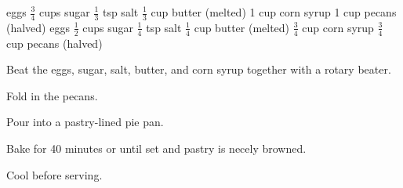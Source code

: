 \dishtype{\dessert}
\dishother{\vegetarian}
\begin{ingreds}
     eggs
        $\frac{3}{4}$ cups sugar
        $\frac{1}{3}$ tsp salt
        $\frac{1}{3}$ cup butter (melted)
        1 cup corn syrup
        1 cup pecans (halved)
     eggs
        $\frac{1}{2}$ cups sugar
        $\frac{1}{4}$ tsp salt
        $\frac{1}{4}$ cup butter (melted)
        $\frac{3}{4}$ cup corn syrup
        $\frac{3}{4}$ cup pecans (halved)
\end{ingreds}
\begin{method}
    Beat the eggs, sugar, salt, butter, and corn syrup together with a rotary beater.\par
    Fold in the pecans.\par
    Pour into a pastry-lined pie pan.\par
    Bake for 40 minutes or until set and pastry is necely browned.\par
    Cool before serving.     
\end{method}